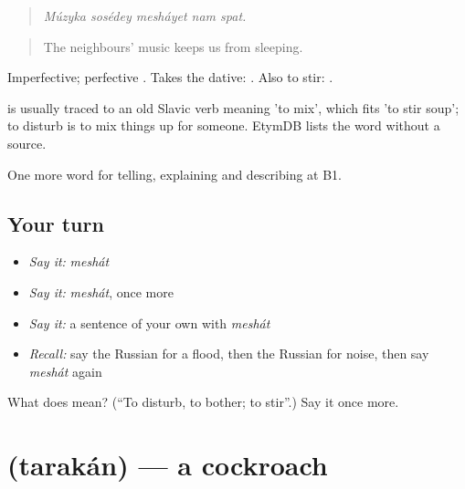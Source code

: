 \begin{quote}
\emph{Múzyka sosédey mesháyet nam spat.}
\end{quote}

\begin{quote}
The neighbours' music keeps us from sleeping.
\end{quote}

Imperfective; perfective \emph{}. Takes the dative: \emph{ }. Also to stir: \emph{ }.

\begin{cousinweb}
\emph{} is usually traced to an old Slavic verb meaning 'to mix', which fits \emph{ } 'to stir soup'; to disturb is to mix things up for someone. EtymDB lists the word without a source.
\end{cousinweb}

\begin{grammarlens}[title={What you've built}]
One more word for telling, explaining and describing at B1.
\end{grammarlens}

\subsection*{Your turn}
\begin{itemize}
\raggedright
  \item \emph{Say it:} \emph{meshát}
  \item \emph{Say it:} \emph{meshát}, once more
  \item \emph{Say it:} a sentence of your own with \emph{meshát}
  \item \emph{Recall:} say the Russian for a flood, then the Russian for noise, then say \emph{meshát} again
\end{itemize}

\begin{tcolorbox}[breakable,colback=teal!4,colframe=teal!35!black,title={Before you move on}]
What does  mean? (\textquotedblleft{}To disturb, to bother; to stir\textquotedblright{}.) Say it once more.
\end{tcolorbox}
\section[\texorpdfstring{\ru{таракан} (tarakán)}{таракан (tarakán)}]{ (tarakán) — a cockroach}

\label{lesson:RU-C433-tarakan}



